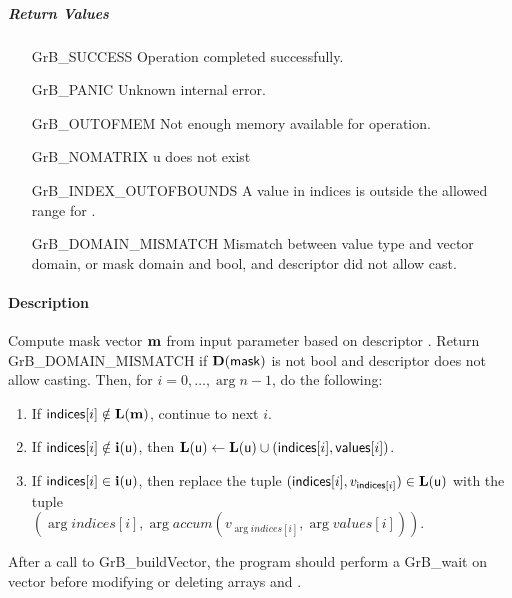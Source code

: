 \subparagraph{Return Values}

\begin{itemize}[leftmargin=2.1in]
	\item[{\sf GrB\_SUCCESS}] 	Operation completed successfully.
	\item[{\sf GrB\_PANIC}]	    	Unknown internal error.
	\item[{\sf GrB\_OUTOFMEM}]	Not enough memory available for operation.
	\item[{\sf GrB\_NOMATRIX}]  	{\sf u} does not exist
	\item[{\sf GrB\_INDEX\_OUTOFBOUNDS}]
       		 			A value in {\sf indices} is outside the allowed range for .
	\item[\sf GrB\_DOMAIN\_MISMATCH]  
		   			Mismatch between value type and vector domain, or mask domain and {\sf bool},  and descriptor did not allow cast.
\end{itemize}

\paragraph{Description}

Compute mask vector $\vector{m}$ from input parameter  based on descriptor .
Return {\sf GrB\_DOMAIN\_MISMATCH} if $\bold{D}({\sf mask})$ is not {\sf bool} and descriptor does not allow casting.
Then, for $i = 0,\ldots,\arg{n}-1$, do the following:
\begin{enumerate}
	\item If $\arg{indices}[i] \notin \bold{L}(\vector{m})$, continue to next $i$.
	\item If $\arg{indices}[i] \notin \bold{i}(\arg{u})$, then $\bold{L}(\arg{u}) \leftarrow \bold{L}(\arg{u}) \cup (\arg{indices}[i], \arg{values}[i])$.
	\item If $\arg{indices}[i] \in \bold{i}(\arg{u})$, then replace the tuple $(\arg{indices}[i], v_{\arg{indices}[i]}) \in \bold{L}(\arg{u})$ with the tuple \\ $(\arg{indices}[i], \arg{accum}(v_{\arg{indices}[i]},\arg{val    ues}[i]))$.
\end{enumerate}

After a call to {\sf GrB\_buildVector}, the program should perform a {\sf GrB\_wait} on vector  before
modifying or deleting arrays  and .


